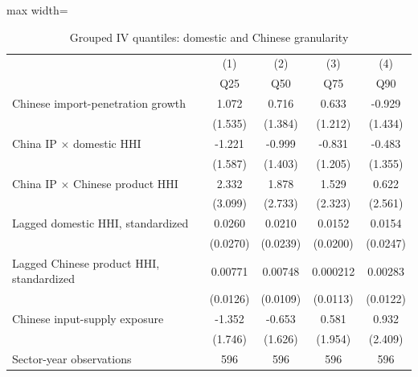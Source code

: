 \begin{table}[htbp]\centering
\def\sym#1{\ifmmode^{#1}\else\(^{#1}\)\fi}
\caption{Grouped IV quantiles: domestic and Chinese granularity}
\label{tab:rob_chn_gran_givq_dom_foreign}
\scriptsize
\setlength{\tabcolsep}{3pt}
\begin{adjustbox}{max width=\textwidth}
\begin{tabular}{l*{4}{c}}
\toprule
                &\multicolumn{1}{c}{(1)}&\multicolumn{1}{c}{(2)}&\multicolumn{1}{c}{(3)}&\multicolumn{1}{c}{(4)}\\
                &\multicolumn{1}{c}{Q25}&\multicolumn{1}{c}{Q50}&\multicolumn{1}{c}{Q75}&\multicolumn{1}{c}{Q90}\\
\midrule
Chinese import-penetration growth&    1.072         &    0.716         &    0.633         &   -0.929         \\
                &  (1.535)         &  (1.384)         &  (1.212)         &  (1.434)         \\
China IP $\times$ domestic HHI&   -1.221         &   -0.999         &   -0.831         &   -0.483         \\
                &  (1.587)         &  (1.403)         &  (1.205)         &  (1.355)         \\
China IP $\times$ Chinese product HHI&    2.332         &    1.878         &    1.529         &    0.622         \\
                &  (3.099)         &  (2.733)         &  (2.323)         &  (2.561)         \\
Lagged domestic HHI, standardized&   0.0260         &   0.0210         &   0.0152         &   0.0154         \\
                & (0.0270)         & (0.0239)         & (0.0200)         & (0.0247)         \\
Lagged Chinese product HHI, standardized&  0.00771         &  0.00748         & 0.000212         &  0.00283         \\
                & (0.0126)         & (0.0109)         & (0.0113)         & (0.0122)         \\
Chinese input-supply exposure&   -1.352         &   -0.653         &    0.581         &    0.932         \\
                &  (1.746)         &  (1.626)         &  (1.954)         &  (2.409)         \\
\midrule
Sector-year observations&      596         &      596         &      596         &      596         \\

\end{tabular}
\end{adjustbox}
\end{table}
